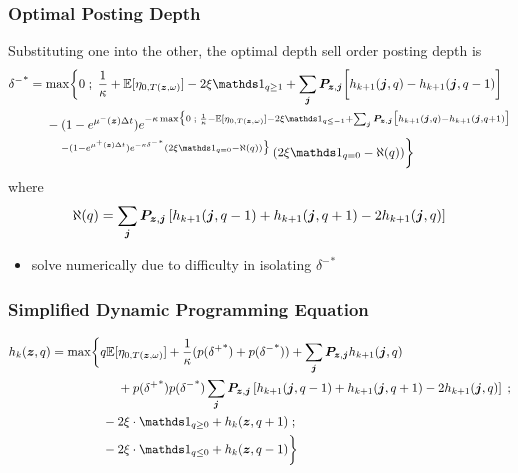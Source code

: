 \begin{frame}
\frametitle{Optimal Posting Depth}
Substituting one into the other, the optimal depth sell order posting depth is
\[
\begin{aligned}
{\delta^-}^* & = \max \biggl\lbrace 0 \; ; \; \frac{1}{\kappa} + \E[\eta_{0,T(\bz, \omega)}] - 2 \xi \indicator_{q \geq 1} + \sum_{\bj} \bP_{\bz,\bj} \biggl[ h_{k+1}(\bj, q) - h_{k+1}(\bj, q-1) \biggr] \\
& \hphantom{{}={}} - (1-e^{\mu^-(\bz) \Delta t})e^{-\kappa \max \bigl\lbrace 0 \; ; \; \frac{1}{\kappa} - \E[\eta_{0,T(\bz, \omega)}] - 2 \xi \indicator_{q \leq -1} + \sum_{\bj} \bP_{\bz,\bj} \bigl[ h_{k+1}(\bj, q) - h_{k+1}(\bj, q+1) \bigr]} \\
& \hphantom{{}={} {}-{}} {}^{-(1-e^{\mu^+ (\bz) \Delta t})e^{-\kappa {\delta^-}^*} \left( 2 \xi \indicator_{q = 0} - \aleph(q) \right) \bigr\rbrace } \left( 2 \xi \indicator_{q = 0} - \aleph(q) \right) \biggr\rbrace
\end{aligned}
\]
where
\[ \aleph(q) = \sum_{\bm{j}} \bm{P}_{\bm{z},\bm{j}} \left[ h_{k+1}(\bm{j}, q-1) + h_{k+1}(\bm{j}, q+1) -2 h_{k+1}(\bm{j}, q)  \right] \]
\begin{itemize}
\item solve numerically due to difficulty in isolating ${\delta^{-}}^*$
\end{itemize}
\end{frame}

\begin{frame}
\frametitle{Simplified Dynamic Programming Equation}
\[
\begin{aligned}
h_k(\bz,q) & = \max \biggl\lbrace 
q\E[\eta_{0,T(\bz, \omega)}] + \frac{1}{\kappa}(p({\delta^+}^*)+p({\delta^-}^*))  + \sum_{\bj} \bP_{\bz,\bj} h_{k+1}(\bj,q) \\ 
& \hphantom{{}={} \max \biggl\lbrace {}+{}} + p({\delta^+}^*)p({\delta^-}^*)\sum_{\bj} \bP_{\bz,\bj} \left[ h_{k+1}(\bj, q-1) + h_{k+1}(\bj, q+1) -2 h_{k+1}(\bj, q)  \right] \; ; \\
& \hphantom{{}={} \max \biggl\lbrace } -2\xi \cdot \indicator_{q \geq 0} + h_k(\bz,q+1) \; ; \\
& \hphantom{{}={} \max \biggl\lbrace } -2\xi \cdot \indicator_{q \leq 0} + h_k(\bz,q-1) \biggr\rbrace
\end{aligned}
\]
\end{frame}

